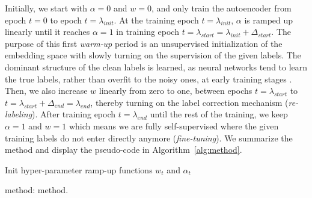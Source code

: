 \documentclass[runningheads, envcountsame, a4paper]{llncs}
\begin{document}
Initially, we start with $\alpha=0$ and  $w=0$, and  only train the autoencoder from epoch $t=0$ to epoch $t=\lambda_{init}$. 
At the training epoch $t=\lambda_{init}$, $\alpha$ is ramped up linearly until it reaches $\alpha=1$ in training epoch $t=\lambda_{start}=\lambda_{init}+\Delta_{start}$. 
The purpose of this first \textit{warm-up} period is an unsupervised initialization of the embedding space with slowly turning on the supervision of the given labels.
The dominant structure of the clean labels is learned, as neural networks tend to learn the true labels, rather than overfit to the noisy ones, at early training stages \cite{zhang2016understanding,arpit2017closer}.
Then, we also increase $w$ linearly from zero to one, between epochs $t=\lambda_{start}$ to $t=\lambda_{start}+\Delta_{end}=\lambda_{end}$, thereby turning on the label correction mechanism (\textit{re-labeling}).
After training epoch $t=\lambda_{end}$ until the rest of the training, we keep $\alpha=1$ and $w=1$ which means we are fully self-supervised  where the given training labels do not enter directly anymore (\textit{fine-tuning}). 
We summarize the \acrshort{method} and display the pseudo-code in Algorithm~\ref{alg:method}.

\begin{algorithm}[t]
\DontPrintSemicolon
\footnotesize
  Init hyper-parameter ramp-up functions $w_t$ and $\alpha_t$ 
\caption{\acrshort{method}: \acrlong{method}.}\label{alg:method}
\end{algorithm}
\end{document}
